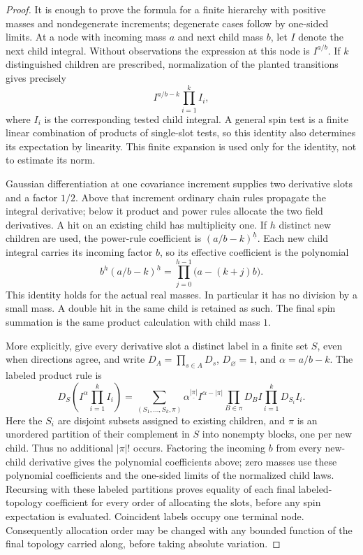 \begin{proof}
It is enough to prove the formula for a finite hierarchy with positive
masses and nondegenerate increments; degenerate cases follow by
one-sided limits. At a node with incoming mass $a$ and next child mass
$b$, let $I$ denote the next child integral. Without observations the
expression at this node is $I^{a/b}$. If $k$ distinguished children are
prescribed, normalization of the planted transitions gives precisely
\[
 I^{a/b-k}\prod_{i=1}^k I_i,
\]
where $I_i$ is the corresponding tested child integral. A general spin
test is a finite linear combination of products of single-slot tests, so
this identity also determines its expectation by linearity. This finite
expansion is used only for the identity, not to estimate its norm.

Gaussian differentiation at one covariance increment supplies two
derivative slots and a factor $1/2$. Above that increment ordinary chain
rules propagate the integral derivative; below it product and power
rules allocate the two field derivatives. A hit on an existing child
has multiplicity one. If $h$ distinct new children are used, the
power-rule coefficient is $(a/b-k)^{\underline h}$. Each new child
integral carries its incoming factor $b$, so its effective coefficient
is the polynomial
\[
 b^h(a/b-k)^{\underline h}
       =\prod_{j=0}^{h-1}\bigl(a-(k+j)b\bigr).
\]
This identity holds for the actual real masses. In particular it has no
division by a small mass. A double hit in the same child is retained as
such. The final spin summation is the same product calculation with
child mass $1$.

More explicitly, give every derivative slot a distinct label in a finite
set $S$, even when directions agree, and write $D_A=\prod_{s\in A}D_s$,
$D_\varnothing=1$, and $\alpha=a/b-k$. The labeled product rule is
\[
 D_S\!\left(I^\alpha\prod_{i=1}^k I_i\right)
 =\sum_{(S_1,\ldots,S_k,\pi)}
   \alpha^{\underline{|\pi|}}I^{\alpha-|\pi|}
   \prod_{B\in\pi}D_BI\prod_{i=1}^kD_{S_i}I_i.
\]
Here the $S_i$ are disjoint subsets assigned to existing children, and
$\pi$ is an unordered partition of their complement in $S$ into nonempty
blocks, one per new child. Thus no additional $|\pi|!$ occurs. Factoring
the incoming $b$ from every new-child derivative gives the polynomial
coefficients above; zero masses use these polynomial coefficients and
the one-sided limits of the normalized child laws. Recursing with these
labeled partitions proves equality of each final labeled-topology
coefficient for every order of allocating the slots, before any spin
expectation is evaluated. Coincident labels occupy one terminal node.
Consequently allocation order may be changed with any bounded function
of the final topology carried along, before taking absolute variation.


\end{proof}
